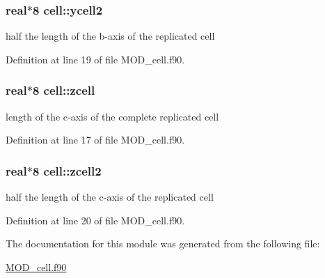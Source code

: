 \hypertarget{classcell_ab57ae66a1f19940f97975944cc3c9aec}{
\subsubsection[{ycell2}]{\setlength{\rightskip}{0pt plus 5cm}real$\ast$8 cell\-::ycell2}}\label{classcell_ab57ae66a1f19940f97975944cc3c9aec}


half the length of the b-\/axis of the replicated cell 



Definition at line 19 of file M\-O\-D\-\_\-cell.\-f90.

\hypertarget{classcell_a00c781998a1d4a6d64326febcb839363}{
\subsubsection[{zcell}]{\setlength{\rightskip}{0pt plus 5cm}real$\ast$8 cell\-::zcell}}\label{classcell_a00c781998a1d4a6d64326febcb839363}


length of the c-\/axis of the complete replicated cell 



Definition at line 17 of file M\-O\-D\-\_\-cell.\-f90.

\hypertarget{classcell_ae51dbd23294cbee762f560a974852eec}{
\subsubsection[{zcell2}]{\setlength{\rightskip}{0pt plus 5cm}real$\ast$8 cell\-::zcell2}}\label{classcell_ae51dbd23294cbee762f560a974852eec}


half the length of the c-\/axis of the replicated cell 



Definition at line 20 of file M\-O\-D\-\_\-cell.\-f90.



The documentation for this module was generated from the following file\-:\begin{DoxyCompactItemize}
\item 
\hyperlink{MOD__cell_8f90}{M\-O\-D\-\_\-cell.\-f90}\end{DoxyCompactItemize}
